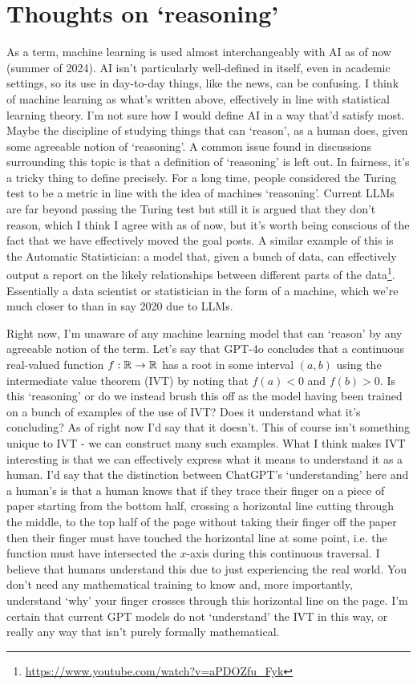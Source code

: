 \documentclass[11pt]{article}
\begin{document}
\section*{Thoughts on `reasoning'}

As a term, machine learning is used almost interchangeably with AI as of now (summer of 2024). AI isn't particularly well-defined in itself, even in academic settings, so its use in day-to-day things, like the news, can be confusing. I think of machine learning as what's written above, effectively in line with statistical learning theory. I'm not sure how I would define AI in a way that'd satisfy most. Maybe the discipline of studying things that can `reason', as a human does, given some agreeable notion of `reasoning'. A common issue found in discussions surrounding this topic is that a definition of `reasoning' is left out. In fairness, it's a tricky thing to define precisely. For a long time, people considered the Turing test to be a metric in line with the idea of machines `reasoning'. Current LLMs are far beyond passing the Turing test but still it is argued that they don't reason, which I think I agree with as of now, but it's worth being conscious of the fact that we have effectively moved the goal posts. A similar example of this is the Automatic Statistician: a model that, given a bunch of data, can effectively output a report on the likely relationships between different parts of the data\footnote{\url{https://www.youtube.com/watch?v=aPDOZfu_Fyk}}. Essentially a data scientist or statistician in the form of a machine, which we're much closer to than in say 2020 due to LLMs.

Right now, I'm unaware of any machine learning model that can `reason' by any agreeable notion of the term. Let's say that GPT-4o concludes that a continuous real-valued function $f:\mathbb{R}\rightarrow\mathbb{R}$ has a root in some interval $(a, b)$ using the intermediate value theorem (IVT) by noting that $f(a)<0$ and $f(b)>0$. Is this `reasoning' or do we instead brush this off as the model having been trained on a bunch of examples of the use of IVT? Does it understand what it's concluding? As of right now I'd say that it doesn't. This of course isn't something unique to IVT - we can construct many such examples. What I think makes IVT interesting is that we can effectively express what it means to understand it as a human. I'd say that the distinction between ChatGPT's `understanding' here and a human's is that a human knows that if they trace their finger on a piece of paper starting from the bottom half, crossing a horizontal line cutting through the middle, to the top half of the page without taking their finger off the paper then their finger must have touched the horizontal line at some point, i.e. the function must have intersected the $x$-axis during this continuous traversal. I believe that humans understand this due to just experiencing the real world. You don't need any mathematical training to know and, more importantly, understand `why' your finger crosses through this horizontal line on the page. I'm certain that current GPT models do not `understand' the IVT in this way, or really any way that isn't purely formally mathematical.
\end{document}
